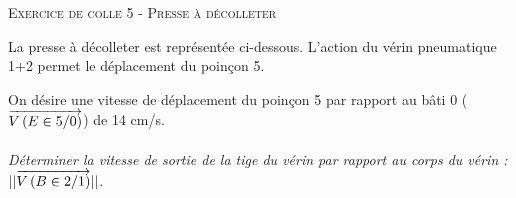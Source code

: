\documentclass[11pt,oneside]{article}
\begin{document}
\pagestyle{fancy}
\renewcommand{\headrulewidth}{0pt}

\fancyhead{}

\fancyhead[C]{\rule{12cm}{.5pt}}


\renewcommand{\footrulewidth}{0.2pt}

\fancyfoot[C]{\footnotesize{\bfseries \thepage}}


\begin{center}
 \LARGE\textsc{Exercice de colle 5 - Presse à décolleter}
\end{center}


\setlength{\parskip}{0ex plus 0.2ex minus 0ex}
 \renewcommand{\contentsname}{}
 \renewcommand{\baselinestretch}{1}

 \renewcommand{\baselinestretch}{1.2}
\setlength{\parskip}{2ex plus 0.5ex minus 0.2ex}

La presse à décolleter est représentée ci-dessous. L’action du vérin pneumatique 1+2 permet le
déplacement du poinçon 5.

On désire une vitesse de déplacement du poinçon 5 par rapport au bâti 0 ($\overrightarrow{V\left( {E} \in {5}/{0}\right)}$) de 14 cm/s.

\begin{minipage}[c]{.45\linewidth}
\end{minipage}\hfill
\begin{minipage}[c]{.45\linewidth}
\end{minipage}

\paragraph{}
\textit{Déterminer la vitesse de sortie de la tige du vérin par rapport au corps du vérin : $||\overrightarrow{V\left( {B} \in {2}/{1}\right)}||$.}
\end{document}
